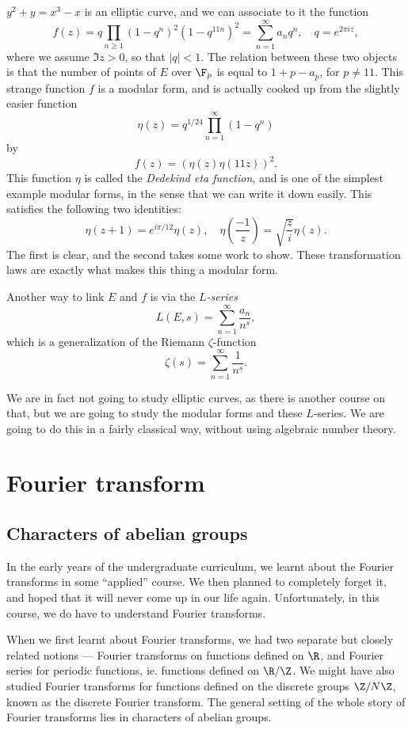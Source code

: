 \documentclass[a4paper]{article}
\begin{document}
\begin{eg}
  $y^2 + y = x^3 - x$ is an elliptic curve, and we can associate to it the function
  \[
    f(z) = q\prod_{n \geq 1} (1 - q^n)^2 (1 - q^{11n})^2 = \sum_{n = 1}^\infty a_n q^n,\quad q= e^{2\pi i z},
  \]
  where we assume $\Im z > 0$, so that $|q| < 1$. The relation between these two objects is that the number of points of $E$ over $\F_p$ is equal to $1 + p - a_p$, for $p \not= 11$. This strange function $f$ is a modular form, and is actually cooked up from the slightly easier function
  \[
    \eta(z) = q^{1/24} \prod_{n = 1}^\infty (1 - q^n)
  \]
  by
  \[
    f(z) = (\eta(z)\eta(11z))^2.
  \]
  This function $\eta$ is called the \emph{Dedekind eta function}, and is one of the simplest example modular forms, in the sense that we can write it down easily. This satisfies the following two identities:
  \[
    \eta(z + 1) = e^{i \pi/12}\eta(z),\quad \eta\left(\frac{-1}{z}\right) = \sqrt{\frac{z}{i}} \eta(z).
  \]
  The first is clear, and the second takes some work to show. These transformation laws are exactly what makes this thing a modular form.

  Another way to link $E$ and $f$ is via the \emph{$L$-series}
  \[
    L(E, s) = \sum_{n = 1}^\infty \frac{a_n}{n^s},
  \]
  which is a generalization of the Riemann $\zeta$-function
  \[
    \zeta(s) = \sum_{n = 1}^\infty \frac{1}{n^s}.
  \]
\end{eg}
We are in fact not going to study elliptic curves, as there is another course on that, but we are going to study the modular forms and these $L$-series. We are going to do this in a fairly classical way, without using algebraic number theory.

\section{Fourier transform}
\subsection{Characters of abelian groups}
In the early years of the undergraduate curriculum, we learnt about the Fourier transforms in some ``applied'' course. We then planned to completely forget it, and hoped that it will never come up in our life again. Unfortunately, in this course, we do have to understand Fourier transforms.

When we first learnt about Fourier transforms, we had two separate but closely related notions --- Fourier transforms on functions defined on $\R$, and Fourier series for periodic functions, ie. functions defined on $\R/\Z$. We might have also studied Fourier transforms for functions defined on the discrete groups $\Z/N\Z$, known as the discrete Fourier transform. The general setting of the whole story of Fourier transforms lies in characters of abelian groups.
\end{document}

